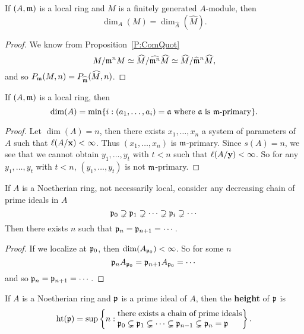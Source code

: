 \documentclass{ximera}
\begin{document}
\begin{corollary} If $(A,\mathfrak{m})$ is a local ring and $M$ is a finitely generated $A$-module, then 
\[
\dim_A(M) =\dim_{\hat{A}}(\hat{M}).
\]
\end{corollary}

\begin{proof} We know from Proposition~\ref{P:ComQuot}
\[
M/\mathfrak{m}^n M \simeq \widehat{M}/\widehat{\mathfrak{m}^n} \widehat{M} \simeq \widehat{M}/ \widehat{\mathfrak{m}}^n\widehat{M},
\]
and so $P_{\mathfrak{m}}(M,n) = P_{\widehat{\mathfrak{m}}}(\widehat{M},n)$.
\end{proof}


\begin{corollary} If $(A,\mathfrak{m})$ is a local ring, then 
\[
\dim(A) = \min\{i: (a_1,\dots,a_i) = \mathfrak{a}\text{ where $\mathfrak{a}$ is $\mathfrak{m}$-primary}\}.
\]
\end{corollary}

\begin{proof} Let $\dim(A) = n$, then there exists $x_1,\dots,x_n$ a system of parameters of $A$ such that $\ell(A/\mathbf{x}) <\infty$. Thus $(x_1,\dots,x_n)$ is $\mathfrak{m}$-primary.  Since $s(A) = n$, we see that we cannot obtain $y_1,\dots,y_t$ with $t<n$ such that $\ell(A/\mathbf{y})<\infty$.  So for any $y_1,\ldots,y_t$ with $t < n$, $(y_1,\ldots,y_t)$ is not $\mathfrak{m}$-primary.
\end{proof}


\begin{corollary} If $A$ is a Noetherian ring, not necessarily local, consider any decreasing chain of prime ideals in $A$ 
\[
\mathfrak{p}_0\supsetneq \mathfrak{p}_1\supsetneq \cdots \supsetneq \mathfrak{p}_i\supsetneq \cdots
\]
Then there exists $n$ such that $\mathfrak{p}_n = \mathfrak{p}_{n+1} = \cdots$.
\end{corollary}

\begin{proof} If we localize at $\mathfrak{p}_0$, then $\dim(A_{\mathfrak{p}_0}) <\infty$.  So for some $n$
\[
\mathfrak{p}_n A_{\mathfrak{p}_0} = \mathfrak{p}_{n+1} A_{\mathfrak{p}_0} = \cdots
\]
and so $\mathfrak{p}_n = \mathfrak{p}_{n+1} = \cdots$.
\end{proof}

\begin{definition} If $A$ is a Noetherian ring and $\mathfrak{p}$ is a prime ideal of $A$, then the \textbf{height} of $\mathfrak{p}$ is 
\[
\h(\p) = \sup\left\{n : \begin{minipage}{15em}there exists a chain of prime ideals $\p_0\subsetneq \p_1 \subsetneq \cdots \subsetneq \p_{n-1}\subsetneq \p_n =\p$\end{minipage} \right\}.
\]
\end{definition}
\end{document}
